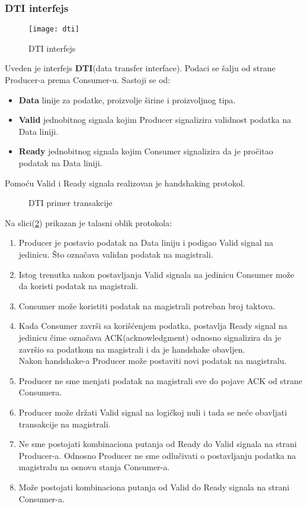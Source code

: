 \subsubsection{DTI interfejs}
\begin{figure}[h]
  \centering
  \texttt{[image: dti]}
  \caption{DTI interfejs\cite{PyGears_OSDA}}
  \label{DTI_intf_img}
\end{figure}

Uveden je interfejs \textbf{DTI}(data transfer interface).
Podaci se šalju od strane Producer-a prema Consumer-u.
Sastoji se od:
\begin{itemize}
\item \textbf{Data} linije za podatke, proizvolje širine i proizvoljnog tipa.
\item \textbf{Valid} jednobitnog signala kojim Producer signalizira validnost
  podatka na Data liniji.
\item \textbf{Ready} jednobitnog signala kojim Consumer signalizira da je
  pročitao podatak na Data liniji.
\end{itemize}
Pomoću Valid i Ready signala realizovan je handshaking protokol. \\

\begin{figure}[H]
\centering{
  \scalebox{1.2}{
    
  }}
\caption{DTI primer transakcije}
\label{dti_example1}
\end{figure}

Na slici(\ref{dti_example1}) prikazan je talasni oblik protokola:
\begin{enumerate}
\item Producer je postavio podatak na Data liniju i podigao Valid signal na
  jedinicu. Što označava validan podatak na magistrali.
\item Istog trenutka nakon postavljanja Valid signala na jedinicu Consumer može
  da koristi podatak na magistrali.
\item Consumer može koristiti podatak na magistrali potreban broj taktova.
\item Kada Consumer završi sa korišćenjem podatka, postavlja Ready signal na
  jedinicu čime označava ACK(acknowledgment) odnosno signalizira da je završio
  sa podatkom na magistrali i da je handshake obavljen. \\
  Nakon handshake-a Producer može postaviti novi podatak na magistralu.
\item Producer ne sme menjati podatak na magistrali sve do pojave ACK od strane
  Consumera.
\item Producer može držati Valid signal na logičkoj nuli i tada se neće
  obavljati transakcije na magistrali.
\item Ne sme postojati kombinaciona putanja od Ready do Valid signala na strani
  Producer-a.
  Odnosno Producer ne sme odlučivati o postavljanju podatka na magistralu na
  osnovu stanja Consumer-a.
\item Može postojati kombinaciona putanja od Valid do Ready signala na strani
  Consumer-a.

\end{enumerate}


